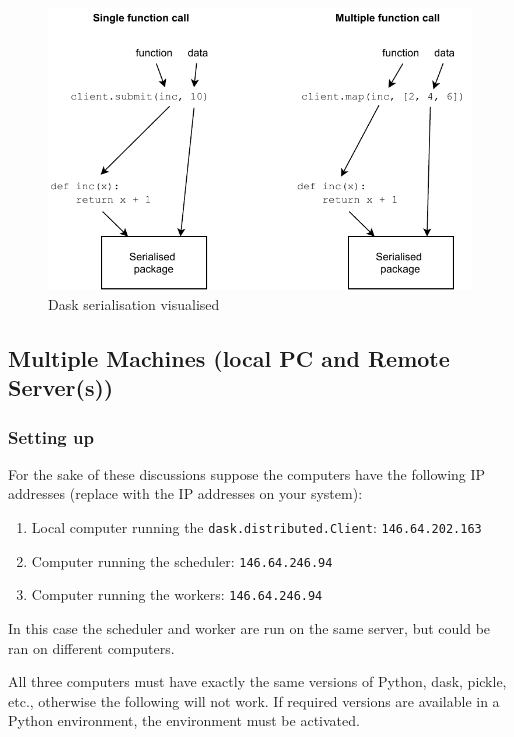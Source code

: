 \begin{figure}[htbp]
    \centering
\includegraphics[width=.8\textwidth]{pic/DaskSerialisation02}
    \caption{Dask serialisation visualised}
    \label{fig:DaskSerialisation02}
\end{figure}


\subsection{Multiple Machines (local PC and Remote Server(s))}
\label{sec:MultipleMachineslocalPCandRemoteServers}


\subsubsection{Setting up}
\label{sec:Settingup}

For the sake of these discussions suppose the computers have the following  IP addresses (replace with the IP addresses on your system):
\begin{enumerate}
\item Local computer running the \verb+dask.distributed.Client+:  \verb+146.64.202.163+
\item Computer running the scheduler: \verb+146.64.246.94+
\item Computer running the workers: \verb+146.64.246.94+
\end{enumerate}



In this case the scheduler and worker are run on the same server, but could be ran on different computers.


All three computers must have exactly the same versions of Python, dask, pickle, etc., otherwise the following will not work. If required versions are available in a Python environment, the environment must be activated.


